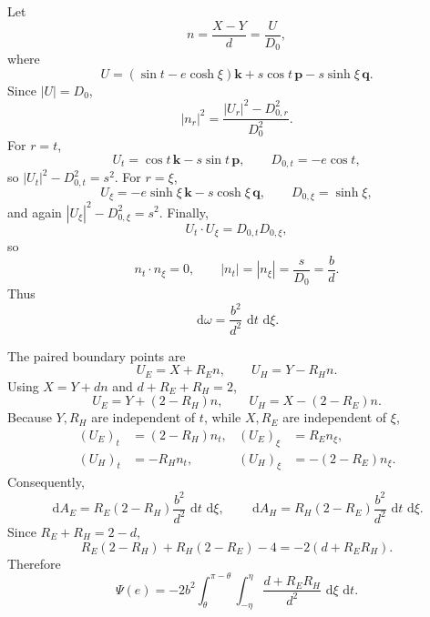 \documentclass[11pt]{article}
\numberwithin{equation}{section}
\theoremstyle{remark}
\newcommand{\dd}{\,\mathrm d}
\begin{document}
Let
\[
  n=\frac{X-Y}{d}=\frac{U}{D_0},
\]
where
\[
  U=(\sin t-e\cosh\xi)\mathbf k
   +s\cos t\,\mathbf p-s\sinh\xi\,\mathbf q.
\]
Since \(|U|=D_0\),
\[
  |n_r|^2=\frac{|U_r|^2-D_{0,r}^2}{D_0^2}.
\]
For \(r=t\),
\[
  U_t=\cos t\,\mathbf k-s\sin t\,\mathbf p,
  \qquad D_{0,t}=-e\cos t,
\]
so \(|U_t|^2-D_{0,t}^2=s^2\).  For \(r=\xi\),
\[
  U_\xi=-e\sinh\xi\,\mathbf k-s\cosh\xi\,\mathbf q,
  \qquad D_{0,\xi}=\sinh\xi,
\]
and again \(|U_\xi|^2-D_{0,\xi}^2=s^2\).  Finally,
\[
  U_t\cdot U_\xi=D_{0,t}D_{0,\xi},
\]
so
\begin{equation}
  n_t\cdot n_\xi=0,
  \qquad
  |n_t|=|n_\xi|=\frac{s}{D_0}=\frac bd.
  \label{eq:conformal}
\end{equation}
Thus
\begin{equation}
  \dd\omega=\frac{b^2}{d^2}\,\dd t\,\dd\xi.
  \label{eq:area-element}
\end{equation}

The paired boundary points are
\[
  U_E=X+R_En,
  \qquad
  U_H=Y-R_Hn.
\]
Using \(X=Y+dn\) and \(d+R_E+R_H=2\),
\[
  U_E=Y+(2-R_H)n,
  \qquad
  U_H=X-(2-R_E)n.
\]
Because \(Y,R_H\) are independent of \(t\), while \(X,R_E\) are independent of \(\xi\),
\begin{align*}
  (U_E)_t&=(2-R_H)n_t,& (U_E)_\xi&=R_En_\xi,\\
  (U_H)_t&=-R_Hn_t,& (U_H)_\xi&=-(2-R_E)n_\xi.
\end{align*}
Consequently,
\[
  \dd A_E=R_E(2-R_H)\frac{b^2}{d^2}\,\dd t\,\dd\xi,
  \qquad
  \dd A_H=R_H(2-R_E)\frac{b^2}{d^2}\,\dd t\,\dd\xi.
\]
Since \(R_E+R_H=2-d\),
\[
  R_E(2-R_H)+R_H(2-R_E)-4=-2(d+R_ER_H).
\]
Therefore
\begin{equation}
  \Psi(e)
  =-2b^2\int_\theta^{\pi-\theta}\int_{-\eta}^{\eta}
  \frac{d+R_ER_H}{d^2}\,\dd\xi\,\dd t.
  \label{eq:psi-2d}
\end{equation}
\end{document}

